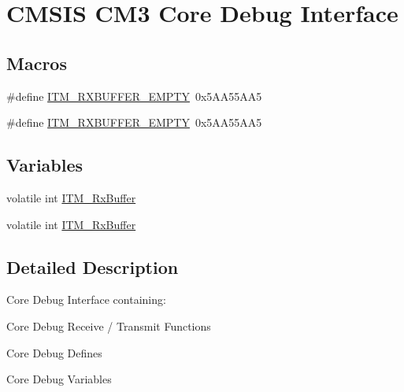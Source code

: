 \hypertarget{group___c_m_s_i_s___c_m3___core_debug_interface}{\section{C\-M\-S\-I\-S C\-M3 Core Debug Interface}
\label{group___c_m_s_i_s___c_m3___core_debug_interface}
}
\subsection*{Macros}
\begin{DoxyCompactItemize}
\item 
\#define \hyperlink{group___c_m_s_i_s___c_m3___core_debug_interface_gaa822cb398ee022b59e9e6c5d7bbb228a}{I\-T\-M\-\_\-\-R\-X\-B\-U\-F\-F\-E\-R\-\_\-\-E\-M\-P\-T\-Y}~0x5\-A\-A55\-A\-A5
\item 
\#define \hyperlink{group___c_m_s_i_s___c_m3___core_debug_interface_gaa822cb398ee022b59e9e6c5d7bbb228a}{I\-T\-M\-\_\-\-R\-X\-B\-U\-F\-F\-E\-R\-\_\-\-E\-M\-P\-T\-Y}~0x5\-A\-A55\-A\-A5
\end{DoxyCompactItemize}
\subsection*{Variables}
\begin{DoxyCompactItemize}
\item 
volatile int \hyperlink{group___c_m_s_i_s___c_m3___core_debug_interface_gacf1fe3063cedf11b6e6f7cb0dd7c1a51}{I\-T\-M\-\_\-\-Rx\-Buffer}
\item 
volatile int \hyperlink{group___c_m_s_i_s___c_m3___core_debug_interface_gacf1fe3063cedf11b6e6f7cb0dd7c1a51}{I\-T\-M\-\_\-\-Rx\-Buffer}
\end{DoxyCompactItemize}


\subsection{Detailed Description}
Core Debug Interface containing\-:
\begin{DoxyItemize}
\item Core Debug Receive / Transmit Functions
\item Core Debug Defines
\item Core Debug Variables 
\end{DoxyItemize}

